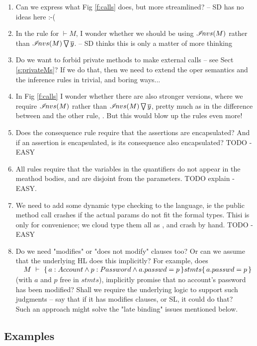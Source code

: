 \begin{enumerate}
\item 
Can we express what Fig \ref{f:calls} does, but more streamlined? -- SD has no ideas here  :-(
\item
In the rule for $\vdash M$,   I wonder whether we should be using ${\extract{M}}$ rather than $\PushAS {y} {\extract{M}}$. -- SD thinks this is only a matter of more thinking
\item
Do we want to forbid private methods to make external calls -- see Sect \ref{s:privateMs}? If we do that, then we need to extend the oper semantics and the inference rules in trivial, and boring ways...
\item
In  Fig \ref{f:calls} I wonder whether there are also stronger versions, where we require ${\extract{M}}$ rather than $\PushAS {y} {\extract{M}}$, pretty much as in the difference between {}  and the other rule, {}. But this would blow up the rules even more! 
\item
 Does the consequence rule require that the assertions are encapsulated? And if an assertion is encapsulated, is its consequence also encapsulated? TODO - EASY
\item
All rules require that the variables in the quantifiers do not appear in the meathod bodies, and are disjoint from the parameters.
TODO explain -EASY. 
\item  We need to add some dynamic type checking to the language, ie the public method call crashes if the actual params do not fit the formal types. Thisi is only for convenience; we cloud type them all as , and crash by hand. TODO - EASY
\item
Do we need "modifies" or "does not modify" clauses too? Or can we assume that the underlying HL does this implicitly? For example, does\\
$\strut \ \ \  \hproves{M}  {a:Account \wedge p:Password \wedge a.passwd=p} {stmts}  {a.passwd=p}$\\ (with $a$ and $p$  free in $stmts$),  implicitly promise that no account's password has been modified? Shall we require the underlying logic to support such judgments -- say that if it has modifies clauses, or SL, it could do that?\\
Such an approach might solve the "late binding" issues mentioned below.
\end{enumerate}
 

\subsection{Examples}

